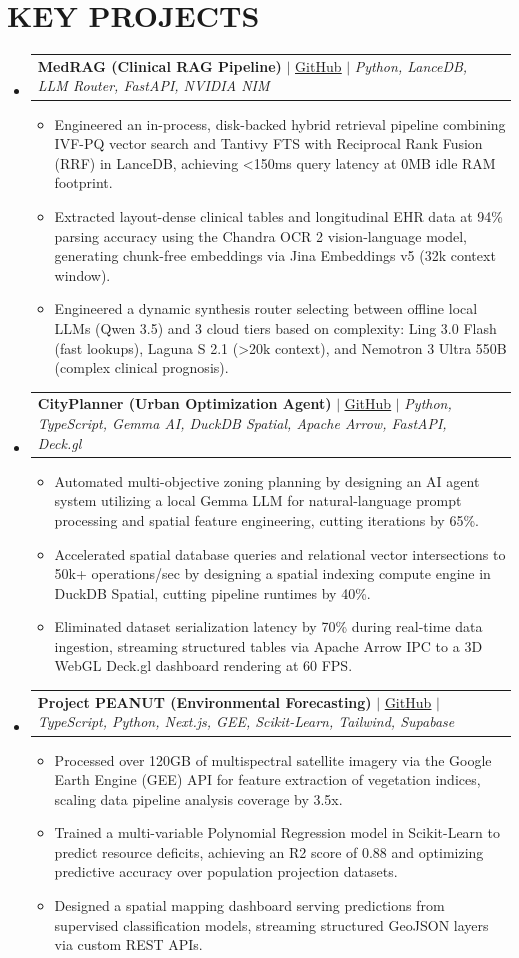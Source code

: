 \documentclass[letterpaper,10pt]{article}
\makeatletter
\newcommand{\resumeItem}[1]{
  \item\small{
    {#1 \vspace{-2pt}}
  }
}
\newcommand{\resumeProjectHeading}[2]{
    \item
    \begin{tabular*}{0.97\textwidth}{l@{\extracolsep{\fill}}r}
      \small#1 & #2 \\
    \end{tabular*}\vspace{-7pt}
}
\newcommand{\resumeSubHeadingListStart}{\begin{itemize}[leftmargin=0.15in, label={}]}
\newcommand{\resumeSubHeadingListEnd}{\end{itemize}}
\newcommand{\resumeItemListStart}{\begin{itemize}}
\newcommand{\resumeItemListEnd}{\end{itemize}\vspace{-5pt}}
\makeatother
\begin{document}
\section{KEY PROJECTS}
    \resumeSubHeadingListStart
      \resumeProjectHeading
          {\textbf{MedRAG (Clinical RAG Pipeline)} $|$ \href{https://github.com/Amith-S28/BestSAASEver}{\underline{GitHub}} $|$ \emph{Python, LanceDB, LLM Router, FastAPI, NVIDIA NIM}}{}
          \resumeItemListStart
            \resumeItem{Engineered an in-process, disk-backed hybrid retrieval pipeline combining IVF-PQ vector search and Tantivy FTS with Reciprocal Rank Fusion (RRF) in LanceDB, achieving <150ms query latency at 0MB idle RAM footprint.}
            \resumeItem{Extracted layout-dense clinical tables and longitudinal EHR data at 94\% parsing accuracy using the Chandra OCR 2 vision-language model, generating chunk-free embeddings via Jina Embeddings v5 (32k context window).}
            \resumeItem{Engineered a dynamic synthesis router selecting between offline local LLMs (Qwen 3.5) and 3 cloud tiers based on complexity: Ling 3.0 Flash (fast lookups), Laguna S 2.1 (>20k context), and Nemotron 3 Ultra 550B (complex clinical prognosis).}
          \resumeItemListEnd
      \resumeProjectHeading
          {\textbf{CityPlanner (Urban Optimization Agent)} $|$ \href{https://github.com/Amith-S28/CityPlanner}{\underline{GitHub}} $|$ \emph{Python, TypeScript, Gemma AI, DuckDB Spatial, Apache Arrow, FastAPI, Deck.gl}}{}
          \resumeItemListStart
            \resumeItem{Automated multi-objective zoning planning by designing an AI agent system utilizing a local Gemma LLM for natural-language prompt processing and spatial feature engineering, cutting iterations by 65\%.}
            \resumeItem{Accelerated spatial database queries and relational vector intersections to 50k+ operations/sec by designing a spatial indexing compute engine in DuckDB Spatial, cutting pipeline runtimes by 40\%.}
            \resumeItem{Eliminated dataset serialization latency by 70\% during real-time data ingestion, streaming structured tables via Apache Arrow IPC to a 3D WebGL Deck.gl dashboard rendering at 60 FPS.}
          \resumeItemListEnd
      \resumeProjectHeading
          {\textbf{Project PEANUT (Environmental Forecasting)} $|$ \href{https://github.com/Amith-S28/Project-PEANUT}{\underline{GitHub}} $|$ \emph{TypeScript, Python, Next.js, GEE, Scikit-Learn, Tailwind, Supabase}}{}
          \resumeItemListStart
            \resumeItem{Processed over 120GB of multispectral satellite imagery via the Google Earth Engine (GEE) API for feature extraction of vegetation indices, scaling data pipeline analysis coverage by 3.5x.}
            \resumeItem{Trained a multi-variable Polynomial Regression model in Scikit-Learn to predict resource deficits, achieving an R2 score of 0.88 and optimizing predictive accuracy over population projection datasets.}
            \resumeItem{Designed a spatial mapping dashboard serving predictions from supervised classification models, streaming structured GeoJSON layers via custom REST APIs.}
          \resumeItemListEnd
    \resumeSubHeadingListEnd
\end{document}
